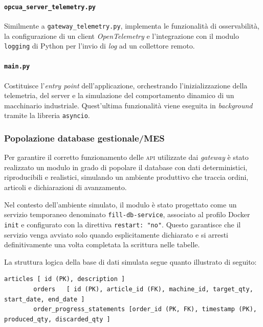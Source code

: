 \documentclass[12pt]{article}
\begin{document}
    \paragraph{\texttt{opcua\_server\_telemetry.py}} Similmente a \texttt{gateway\_telemetry.py}, implementa le funzionalità di osservabilità, la configurazione di un client \textit{OpenTelemetry} e l'integrazione con il modulo \verb|logging| di Python per l'invio di \textit{log} ad un collettore remoto.
 
    \paragraph{\texttt{main.py}} Costituisce l'\textit{entry point} dell'applicazione, orchestrando l'inizializzazione della telemetria, del server e la simulazione del comportamento dinamico di un macchinario industriale. Quest'ultima funzionalità viene eseguita in \textit{background} tramite la libreria \verb|asyncio|.

    \subsubsection{Popolazione database gestionale/MES}

    Per garantire il corretto funzionamento delle \textsc{api} utilizzate dai \textit{gateway} è stato realizzato un modulo in grado di popolare il database con dati deterministici, riproducibili e realistici, simulando un ambiente produttivo che traccia ordini, articoli e dichiarazioni di avanzamento.

    Nel contesto dell'ambiente simulato, il modulo è stato progettato come un servizio temporaneo denominato \verb|fill-db-service|, associato al profilo Docker \verb|init| e configurato con la direttiva \verb|restart: "no"|. Questo garantisce che il servizio venga avviato solo quando esplicitamente dichiarato e si arresti definitivamente una volta completata la scrittura nelle tabelle.
    
    La struttura logica della base di dati simulata segue quanto illustrato di seguito:
    \begin{lstlisting}[breaklines=true, basicstyle=\ttfamily\small, columns=fullflexible]
        articles [ id (PK), description ]
        orders   [ id (PK), article_id (FK), machine_id, target_qty, start_date, end_date ]
        order_progress_statements [order_id (PK, FK), timestamp (PK), produced_qty, discarded_qty ]
    \end{lstlisting}
\end{document}
